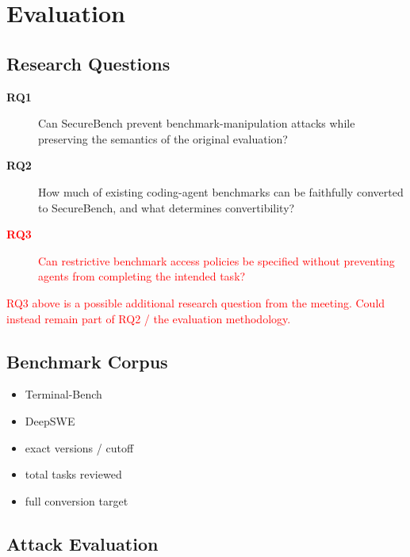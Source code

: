 \documentclass[conference]{IEEEtran}
\newcommand{\draft}[1]{%
    \par\noindent
    {\color{gray}\small #1}
    \par
}
\newcommand{\teacher}[1]{\textcolor{red}{#1}}
\begin{document}

\section{Evaluation}

\subsection{Research Questions}

\begin{description}

    \item[\textbf{RQ1}]
    Can SecureBench prevent benchmark-manipulation attacks while
    preserving the semantics of the original evaluation?

    \item[\textbf{RQ2}]
    How much of existing coding-agent benchmarks can be faithfully
    converted to SecureBench, and what determines convertibility?

    \item[\teacher{\textbf{RQ3}}]
    \teacher{Can restrictive benchmark access policies be specified
    without preventing agents from completing the intended task?}

\end{description}

\draft{
\teacher{
RQ3 above is a possible additional research question from the meeting.
Could instead remain part of RQ2 / the evaluation methodology.
}
}

\subsection{Benchmark Corpus}

\draft{
\begin{itemize}
    \item Terminal-Bench
    \item DeepSWE
    \item exact versions / cutoff
    \item total tasks reviewed
    \item full conversion target
\end{itemize}
}

\subsection{Attack Evaluation}
\end{document}
